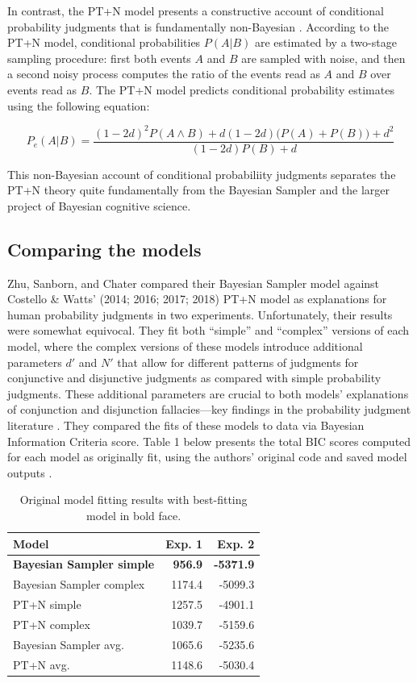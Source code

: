 \documentclass[
  man,floatsintext]{apa6}
\begin{document}
In contrast, the PT+N model presents a constructive account of conditional probability judgments that is fundamentally non-Bayesian \autocite{costello.watts2016}. According to the PT+N model, conditional probabilities \(P(A|B)\) are estimated by a two-stage sampling procedure: first both events \(A\) and \(B\) are sampled with noise, and then a second noisy process computes the ratio of the events read as \(A\) and \(B\) over events read as \(B\). The PT+N model predicts conditional probability estimates using the following equation:

\[P_e(A|B) = \frac{(1-2d)^2P(A \land B) + d(1-2d)\big(P(A)+P(B)\big)+d^2}{(1-2d)P(B)+d}\]

This non-Bayesian account of conditional probabiliity judgments separates the PT+N theory quite fundamentally from the Bayesian Sampler and the larger project of Bayesian cognitive science.

\hypertarget{comparing-the-models}{%
\subsection{Comparing the models}\label{comparing-the-models}}

Zhu, Sanborn, and Chater \autocite*{zhu.etal2020} compared their Bayesian Sampler model against Costello \& Watts' (2014; 2016; 2017; 2018) PT+N model as explanations for human probability judgments in two experiments. Unfortunately, their results were somewhat equivocal. They fit both ``simple'' and ``complex'' versions of each model, where the complex versions of these models introduce additional parameters \(d'\) and \(N'\) that allow for different patterns of judgments for conjunctive and disjunctive judgments as compared with simple probability judgments. These additional parameters are crucial to both models' explanations of conjunction and disjunction fallacies---key findings in the probability judgment literature \autocite{costello.watts2017,zhu.etal2020}. They compared the fits of these models to data via Bayesian Information Criteria score. Table 1 below presents the total BIC scores computed for each model as originally fit, using the authors' original code and saved model outputs \autocite[Supplementary materials]{zhu.etal2020}.

\begin{table}

\caption{\label{tab:table1}Original model fitting results with best-fitting model in bold face.}
\centering
\begin{tabular}[t]{lrr}
\toprule
Model & Exp. 1 & Exp. 2\\
\midrule
\textbf{Bayesian Sampler simple} & \textbf{956.9} & \textbf{-5371.9}\\
Bayesian Sampler complex & 1174.4 & -5099.3\\
PT+N simple & 1257.5 & -4901.1\\
PT+N complex & 1039.7 & -5159.6\\
Bayesian Sampler avg. & 1065.6 & -5235.6\\
\addlinespace
PT+N avg. & 1148.6 & -5030.4\\
\bottomrule
\end{tabular}
\end{table}
\end{document}
